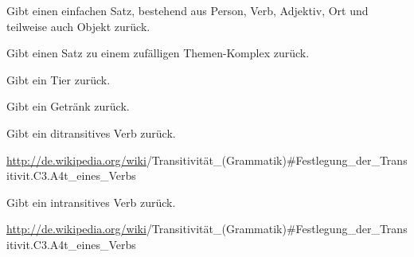 \documentclass[a4paper,12pt,oneside]{sphinxmanual}
\begin{document}
\begin{fulllineitems}
\label{funktionen:pyzufall.standard_satz}
Gibt einen einfachen Satz, bestehend aus Person, Verb, Adjektiv, Ort und teilweise auch Objekt zurück.

\end{fulllineitems}


\begin{fulllineitems}
\label{funktionen:pyzufall.themen_satz}
Gibt einen Satz zu einem zufälligen Themen-Komplex zurück.

\end{fulllineitems}


\begin{fulllineitems}
\label{funktionen:pyzufall.tier}
Gibt ein Tier zurück.

\end{fulllineitems}


\begin{fulllineitems}
\label{funktionen:pyzufall.trinken}
Gibt ein Getränk zurück.

\end{fulllineitems}


\begin{fulllineitems}
\label{funktionen:pyzufall.verbd}
Gibt ein ditransitives Verb zurück.

\href{http://de.wikipedia.org/wiki}{http://de.wikipedia.org/wiki}/Transitivität\_(Grammatik)\#Festlegung\_der\_Transitivit.C3.A4t\_eines\_Verbs

\end{fulllineitems}


\begin{fulllineitems}
\label{funktionen:pyzufall.verbi}
Gibt ein intransitives Verb zurück.

\href{http://de.wikipedia.org/wiki}{http://de.wikipedia.org/wiki}/Transitivität\_(Grammatik)\#Festlegung\_der\_Transitivit.C3.A4t\_eines\_Verbs

\end{fulllineitems}
\end{document}
